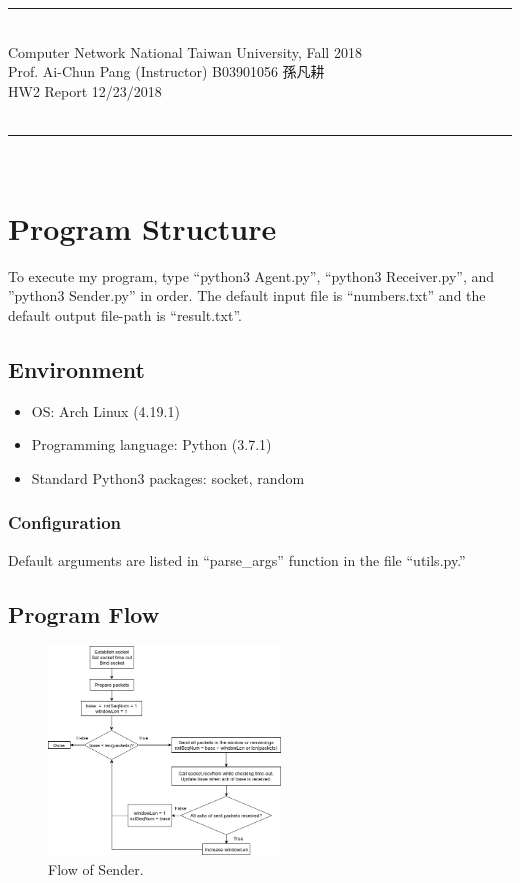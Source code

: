 \documentclass{article}
\begin{document}
{\bf \noindent
\rule[3pt]{\textwidth}{0.3pt}\\
Computer Network \hfill National Taiwan University, Fall 2018 \\
Prof. Ai-Chun Pang (Instructor) \hfill B03901056 孫凡耕 \\
HW2 Report \hfill 12/23/2018 \\
\vspace{-14pt} \\
\rule[3pt]{\textwidth}{1.3pt}\\
[-1cm]
}


\section{Program Structure}

To execute my program, type ``python3 Agent.py'', ``python3 Receiver.py'', and ''python3 Sender.py'' in order.
The default input file is ``numbers.txt'' and the default output file-path is ``result.txt''.

\subsection{Environment}
\begin{itemize}
  \item OS: Arch Linux (4.19.1)
  \item Programming language: Python (3.7.1)
  \item Standard Python3 packages: socket, random
\end{itemize}

\subsubsection{Configuration}
Default arguments are listed in ``parse\_args'' function in the file ``utils.py.''

\subsection{Program Flow}
\begin{figure}[h]
 \centering
 \includegraphics[width=0.55\textwidth]{Sender.png}
 \caption{Flow of Sender.}
\end{figure}
\end{document}
